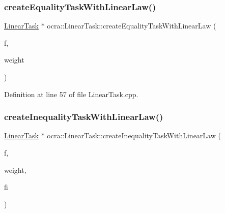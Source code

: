 \hypertarget{classocra_1_1LinearTask_a0e046c85faf7845383754ff76eb98577}{}\label{classocra_1_1LinearTask_a0e046c85faf7845383754ff76eb98577} 
\subsubsection{\texorpdfstring{create\+Equality\+Task\+With\+Linear\+Law()}{createEqualityTaskWithLinearLaw()}\hspace{0.1cm}{\footnotesize\ttfamily [2/2]}}
{\footnotesize\ttfamily \hyperlink{classocra_1_1LinearTask}{Linear\+Task} $\ast$ ocra\+::\+Linear\+Task\+::create\+Equality\+Task\+With\+Linear\+Law (\begin{DoxyParamCaption}\item[{\hyperlink{classocra_1_1Function}{Function} $\ast$}]{f,  }\item[{const Vector\+Xd \&}]{weight }\end{DoxyParamCaption})\hspace{0.3cm}{\ttfamily [static]}}



Definition at line 57 of file Linear\+Task.\+cpp.

\hypertarget{classocra_1_1LinearTask_a27f3ec57a7987a304f6fa3459bbb1471}{}\label{classocra_1_1LinearTask_a27f3ec57a7987a304f6fa3459bbb1471} 
\subsubsection{\texorpdfstring{create\+Inequality\+Task\+With\+Linear\+Law()}{createInequalityTaskWithLinearLaw()}\hspace{0.1cm}{\footnotesize\ttfamily [1/5]}}
{\footnotesize\ttfamily \hyperlink{classocra_1_1LinearTask}{Linear\+Task} $\ast$ ocra\+::\+Linear\+Task\+::create\+Inequality\+Task\+With\+Linear\+Law (\begin{DoxyParamCaption}\item[{\hyperlink{classocra_1_1Function}{Function} $\ast$}]{f,  }\item[{double}]{weight,  }\item[{double}]{fi }\end{DoxyParamCaption})\hspace{0.3cm}{\ttfamily [static]}}



